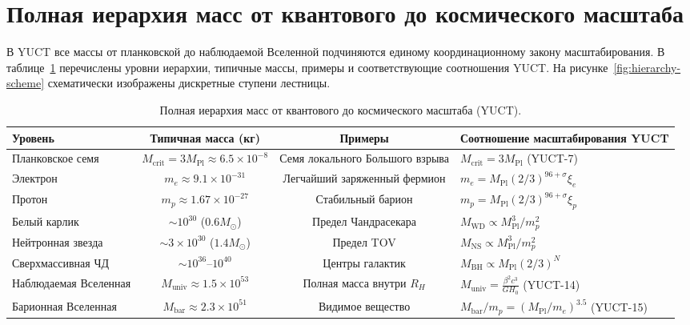 \documentclass[12pt,a4paper]{article}
\newcommand{\betaf}{\beta}
\begin{document}
	\section{Полная иерархия масс от квантового до космического масштаба}
	
	В YUCT все массы от планковской до наблюдаемой Вселенной подчиняются единому координационному закону масштабирования. В таблице~\ref{tab:full-hierarchy} перечислены уровни иерархии, типичные массы, примеры и соответствующие соотношения YUCT. На рисунке~\ref{fig:hierarchy-scheme} схематически изображены дискретные ступени лестницы.
	
	\begin{table}[htbp]
		\centering
		\caption{Полная иерархия масс от квантового до космического масштаба (YUCT).}
		\label{tab:full-hierarchy}
		\scriptsize
		\begin{tabular}{l c c l}
			\toprule
			\textbf{Уровень} & \textbf{Типичная масса (кг)} & \textbf{Примеры} & \textbf{Соотношение масштабирования YUCT} \\
			\midrule
			Планковское семя & \(M_{\mathrm{crit}} = 3M_{\mathrm{Pl}} \approx 6.5\times10^{-8}\) & Семя локального Большого взрыва & \(M_{\mathrm{crit}} = 3 M_{\mathrm{Pl}}\) (YUCT-7) \\
			Электрон & \(m_e \approx 9.1\times10^{-31}\) & Легчайший заряженный фермион & \(m_e = M_{\mathrm{Pl}} (2/3)^{96+\sigma}\xi_e\) \\
			Протон & \(m_p \approx 1.67\times10^{-27}\) & Стабильный барион & \(m_p = M_{\mathrm{Pl}} (2/3)^{96+\sigma}\xi_p\) \\
			Белый карлик & \(\sim 10^{30}\) (\(0.6M_\odot\)) & Предел Чандрасекара & \(M_{\mathrm{WD}} \propto M_{\mathrm{Pl}}^{3}/m_p^2\) \\
			Нейтронная звезда & \(\sim 3\times10^{30}\) (\(1.4M_\odot\)) & Предел TOV & \(M_{\mathrm{NS}} \propto M_{\mathrm{Pl}}^{3}/m_p^2\) \\
			Сверхмассивная ЧД & \(\sim 10^{36}\)–\(10^{40}\) & Центры галактик & \(M_{\mathrm{BH}} \propto M_{\mathrm{Pl}} (2/3)^{N}\) \\
			Наблюдаемая Вселенная & \(M_{\mathrm{univ}} \approx 1.5\times10^{53}\) & Полная масса внутри \(R_H\) & \(M_{\mathrm{univ}} = \frac{\betaf^2 c^3}{G H_0}\) (YUCT-14) \\
			Барионная Вселенная & \(M_{\mathrm{bar}} \approx 2.3\times10^{51}\) & Видимое вещество & \(M_{\mathrm{bar}}/m_p = (M_{\mathrm{Pl}}/m_e)^{3.5}\) (YUCT-15) \\
			\bottomrule
		\end{tabular}
	\end{table}
	
\end{document}
